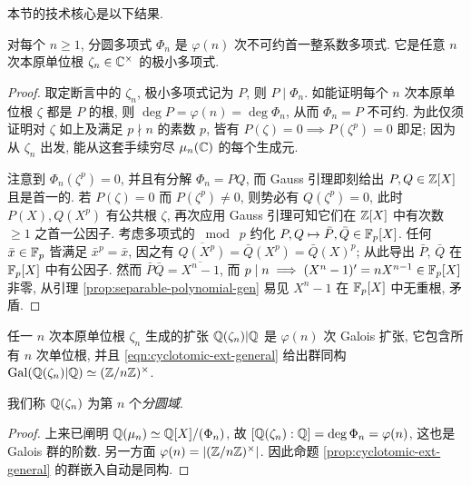 本节的技术核心是以下结果.
\begin{theorem}
	对每个 $n \geq 1$, 分圆多项式 $\Phi_n$ 是 $\varphi(n)$ 次不可约首一整系数多项式. 它是任意 $n$ 次本原单位根 $\zeta_n \in \mathbb{C}^\times$ 的极小多项式.
\end{theorem}
\begin{proof}
	取定断言中的 $\zeta_n$, 极小多项式记为 $P$, 则 $P \mid \Phi_n$. 如能证明每个 $n$ 次本原单位根 $\zeta$ 都是 $P$ 的根, 则 $\deg P = \varphi(n) = \deg \Phi_n$, 从而 $\Phi_n = P$ 不可约. 为此仅须证明对 $\zeta$ 如上及满足 $p \nmid n$ 的素数 $p$, 皆有 $P(\zeta)=0 \implies P(\zeta^p)=0$ 即足; 因为从 $\zeta_n$ 出发, 能从这套手续穷尽 $\mu_n(\mathbb{C})$ 的每个生成元.
	
	注意到 $\Phi_n(\zeta^p)=0$, 并且有分解 $\Phi_n = PQ$, 而 Gauss 引理即刻给出 $P,Q \in \mathbb{Z}[X]$ 且是首一的. 若 $P(\zeta)=0$ 而 $P(\zeta^p) \neq 0$, 则势必有 $Q(\zeta^p)=0$, 此时 $P(X), Q(X^p)$ 有公共根 $\zeta$, 再次应用 Gauss 引理可知它们在 $\mathbb{Z}[X]$ 中有次数 $\geq 1$ 之首一公因子. 考虑多项式的 $\bmod \; p$ 约化 $P,Q \mapsto \bar{P},\bar{Q} \in \mathbb{F}_p[X]$. 任何 $\bar{x} \in \mathbb{F}_p$ 皆满足 $\bar{x}^p = \bar{x}$, 因之有 $\overline{Q(X^p)} = \bar{Q}(X^p) = \bar{Q}(X)^p$; 从此导出 $\bar{P}$, $\bar{Q}$ 在 $\mathbb{F}_p[X]$ 中有公因子. 然而 $\bar{P}\bar{Q} = \overline{X^n-1}$, 而 $p \mid n \implies (X^n-1)' = nX^{n-1} \in \mathbb{F}_p[X]$ 非零, 从引理 \ref{prop:separable-polynomial-gen} 易见 $X^n-1$ 在 $\mathbb{F}_p[X]$ 中无重根, 矛盾.
\end{proof}

\begin{theorem}\label{prop:cyclotomic-Galois}
	任一 $n$ 次本原单位根 $\zeta_n$ 生成的扩张 $\mathbb{Q}(\zeta_n)|\mathbb{Q}$ 是 $\varphi(n)$ 次 Galois 扩张, 它包含所有 $n$ 次单位根, 并且 \eqref{eqn:cyclotomic-ext-general} 给出群同构 $\operatorname{Gal}(\mathbb{Q}(\zeta_n)|\mathbb{Q}) \simeq (\mathbb{Z}/n\mathbb{Z})^\times$.
\end{theorem}
我们称 $\mathbb{Q}(\zeta_n)$ 为第 $n$ 个\emph{分圆域}. 
\begin{proof}
	上来已阐明 $\mathbb{Q}(\mu_n) \simeq \mathbb{Q}[X]/(\Phi_n)$, 故 $[\mathbb{Q}(\zeta_n) : \mathbb{Q}] = \deg \Phi_n = \varphi(n)$, 这也是 Galois 群的阶数. 另一方面 $\varphi(n) = |(\mathbb{Z}/n\mathbb{Z})^\times|$. 因此命题 \ref{prop:cyclotomic-ext-general} 的群嵌入自动是同构.
\end{proof}

